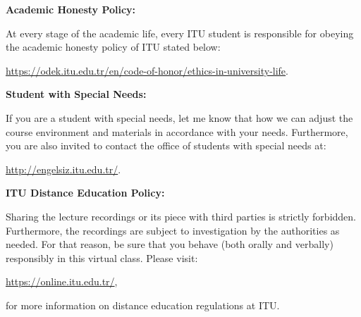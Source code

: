 \documentclass[
  12pt,
]{article}
\begin{document}
\textbf{Academic Honesty Policy:}

At every stage of the academic life, every ITU student is responsible
for obeying the academic honesty policy of ITU stated below:

\url{https://odek.itu.edu.tr/en/code-of-honor/ethics-in-university-life}.

\textbf{Student with Special Needs:}

If you are a student with special needs, let me know that how we can
adjust the course environment and materials in accordance with your
needs. Furthermore, you are also invited to contact the office of
students with special needs at:

\url{http://engelsiz.itu.edu.tr/}.

\textbf{ITU Distance Education Policy:}

Sharing the lecture recordings or its piece with third parties is
strictly forbidden. Furthermore, the recordings are subject to
investigation by the authorities as needed. For that reason, be sure
that you behave (both orally and verbally) responsibly in this virtual
class. Please visit:

\url{https://online.itu.edu.tr/},

for more information on distance education regulations at ITU.
\end{document}
